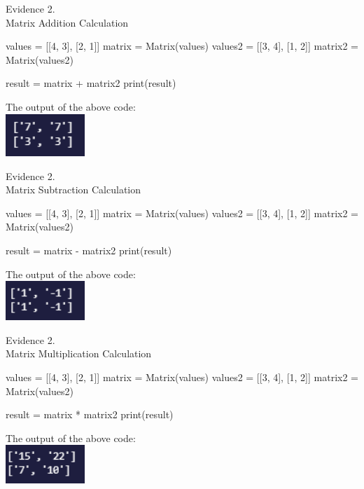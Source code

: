 \begin{center}
    {\large Evidence 2.\rn } \\ 
    \vspace{0.3cm}
    Matrix Addition Calculation \\
    \begin{pythoncode}
values = [[4, 3],
        [2, 1]]
matrix = Matrix(values)
values2 = [[3, 4],
    [1, 2]]
matrix2 = Matrix(values2)

result = matrix + matrix2
print(result)
    \end{pythoncode}
    The output of the above code: \\
    \includegraphics[width=3cm]{Images/Testing/T2.7.1.PNG} \\
    \vspace{1cm}

    {\large Evidence 2.\rn } \\ 
    \vspace{0.3cm}
    Matrix Subtraction Calculation \\
    \begin{pythoncode}
values = [[4, 3],
        [2, 1]]
matrix = Matrix(values)
values2 = [[3, 4],
    [1, 2]]
matrix2 = Matrix(values2)

result = matrix - matrix2
print(result)  
    \end{pythoncode}
    The output of the above code: \\
    \includegraphics[width=3cm]{Images/Testing/T2.8.1.PNG} \\
    \vspace{1cm}

    {\large Evidence 2.\rn } \\ 
    \vspace{0.3cm}
    Matrix Multiplication Calculation \\
    \begin{pythoncode}
values = [[4, 3],
        [2, 1]]
matrix = Matrix(values)
values2 = [[3, 4],
        [1, 2]]
matrix2 = Matrix(values2)

result = matrix * matrix2
print(result)
    \end{pythoncode}
    The output of the above code: \\
    \includegraphics[width=3cm]{Images/Testing/T2.9.1.PNG} \\
    \vspace{1cm}


\end{center}
